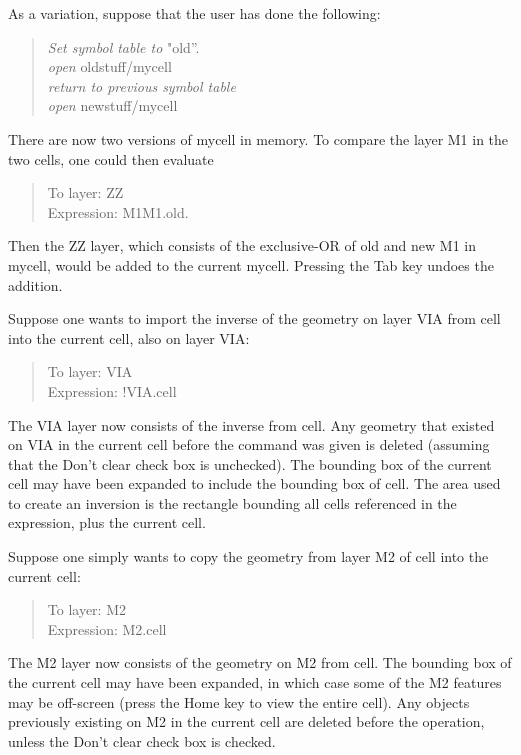 As a variation, suppose that the user has done the following:
\begin{quote}
{\it Set symbol table to} "{\vt old}''.\\
{\it open} {\vt oldstuff/mycell}\\
{\it return to previous symbol table}\\
{\it open} {\vt newstuff/mycell}
\end{quote}

There are now two versions of {\vt mycell} in memory.  To compare the
layer {\vt M1} in the two cells, one could then evaluate
\begin{quote}
{\cb To layer}: {\vt ZZ}\\
{\cb Expression}: {\vt M1M1.old.}
\end{quote}
Then the {\vt ZZ} layer, which consists of the exclusive-OR of old and
new {\vt M1} in {\vt mycell}, would be added to the current {\vt
mycell}.  Pressing the {\kb Tab} key undoes the addition.

Suppose one wants to import the inverse of the geometry on layer {\vt
VIA} from {\vt cell} into the current cell, also on layer {\vt VIA}:
\begin{quote}
{\cb To layer}: {\vt VIA}\\
{\cb Expression}: {\vt !VIA.cell}
\end{quote}
The {\vt VIA} layer now consists of the inverse from {\vt cell}.  Any
geometry that existed on {\vt VIA} in the current cell before the
command was given is deleted (assuming that the {\cb Don't clear}
check box is unchecked).  The bounding box of the current cell may
have been expanded to include the bounding box of {\vt cell}.  The
area used to create an inversion is the rectangle bounding all cells
referenced in the expression, plus the current cell.

Suppose one simply wants to copy the geometry from layer {\vt M2} of
{\vt cell} into the current cell:
\begin{quote}
{\cb To layer}: {\vt M2}\\
{\cb Expression}: {\vt M2.cell}
\end{quote}
The {\vt M2} layer now consists of the geometry on {\vt M2} from {\vt
cell}.  The bounding box of the current cell may have been expanded,
in which case some of the {\vt M2} features may be off-screen (press
the {\kb Home} key to view the entire cell).  Any objects previously
existing on {\vt M2} in the current cell are deleted before the
operation, unless the {\cb Don't clear} check box is checked.


